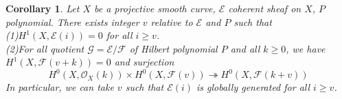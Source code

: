 \documentclass{ctexart}
\newtheorem{corollary}{Corollary}[section]
\begin{document}
\begin{corollary}
    Let $X$ be a projective smooth curve, $\mathcal{E}$ coherent sheaf on $X$, $P$ polynomial.
    There exists integer $v$ relative to $\mathcal{E}$ and $P$ such that \\
    (1)$H^{1}(X, \mathcal{E}(i)) = 0$ for all $i \ge v$. \\
    (2)For all quotient $\mathcal{G} = \mathcal{E}/\mathcal{F}$ of Hilbert polynomial $P$ and all $k \ge 0$,
    we have $H^{1}(X, \mathcal{F}(v + k)) = 0$ and surjection
    \begin{equation}
        H^{0}(X, \mathcal{O}_{X}(k)) \times H^{0}(X, \mathcal{F}(v)) \twoheadrightarrow H^{0}(X, \mathcal{F}(k + v))
    \end{equation}
    In particular, we can take $v$ such that $\mathcal{E}(i)$ is globally generated for all $i \ge v$.
    \label{Corollary 7.8}
\end{corollary}
\end{document}
